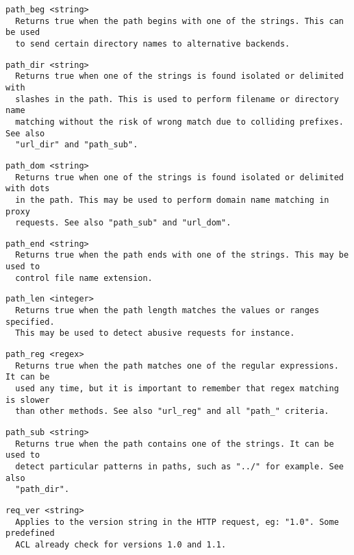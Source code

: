 \begin{verbatim}
path_beg <string>
  Returns true when the path begins with one of the strings. This can be used
  to send certain directory names to alternative backends.
\end{verbatim}

\begin{verbatim}
path_dir <string>
  Returns true when one of the strings is found isolated or delimited with
  slashes in the path. This is used to perform filename or directory name
  matching without the risk of wrong match due to colliding prefixes. See also
  "url_dir" and "path_sub".
\end{verbatim}

\begin{verbatim}
path_dom <string>
  Returns true when one of the strings is found isolated or delimited with dots
  in the path. This may be used to perform domain name matching in proxy
  requests. See also "path_sub" and "url_dom".
\end{verbatim}

\begin{verbatim}
path_end <string>
  Returns true when the path ends with one of the strings. This may be used to
  control file name extension.
\end{verbatim}

\begin{verbatim}
path_len <integer>
  Returns true when the path length matches the values or ranges specified.
  This may be used to detect abusive requests for instance.
\end{verbatim}

\begin{verbatim}
path_reg <regex>
  Returns true when the path matches one of the regular expressions. It can be
  used any time, but it is important to remember that regex matching is slower
  than other methods. See also "url_reg" and all "path_" criteria.
\end{verbatim}

\begin{verbatim}
path_sub <string>
  Returns true when the path contains one of the strings. It can be used to
  detect particular patterns in paths, such as "../" for example. See also
  "path_dir".
\end{verbatim}

\begin{verbatim}
req_ver <string>
  Applies to the version string in the HTTP request, eg: "1.0". Some predefined
  ACL already check for versions 1.0 and 1.1.
\end{verbatim}

